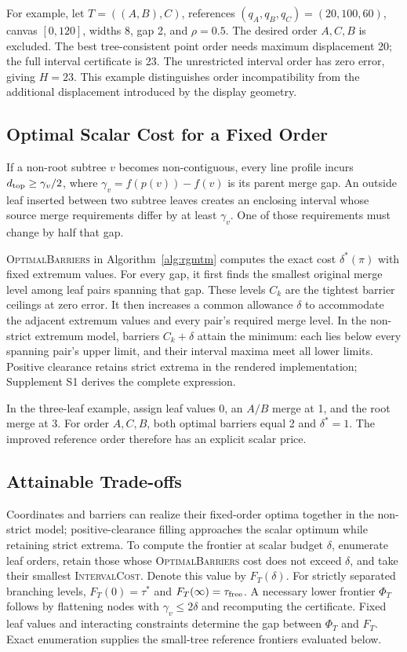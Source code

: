 For example, let $T=((A,B),C)$, references $(q_A,q_B,q_C)=(20,100,60)$, canvas $[0,120]$, widths 8, gap 2, and $\rho=0.5$. The desired order $A,C,B$ is excluded. The best tree-consistent point order needs maximum displacement 20; the full interval certificate is 23. The unrestricted interval order has zero error, giving $H=23$. This example distinguishes order incompatibility from the additional displacement introduced by the display geometry.

\subsection{Optimal Scalar Cost for a Fixed Order}\label{sec:topological}
If a non-root subtree $v$ becomes non-contiguous, every line profile incurs $d_{\rm top}\ge\gamma_v/2$, where $\gamma_v=f(p(v))-f(v)$ is its parent merge gap. An outside leaf inserted between two subtree leaves creates an enclosing interval whose source merge requirements differ by at least $\gamma_v$. One of those requirements must change by half that gap.

\textsc{OptimalBarriers} in Algorithm~\ref{alg:rgmtm} computes the exact cost $\delta^*(\pi)$ with fixed extremum values. For every gap, it first finds the smallest original merge level among leaf pairs spanning that gap. These levels $C_k$ are the tightest barrier ceilings at zero error. It then increases a common allowance $\delta$ to accommodate the adjacent extremum values and every pair's required merge level. In the non-strict extremum model, barriers $C_k+\delta$ attain the minimum: each lies below every spanning pair's upper limit, and their interval maxima meet all lower limits. Positive clearance retains strict extrema in the rendered implementation; Supplement S1 derives the complete expression.

In the three-leaf example, assign leaf values 0, an $A/B$ merge at 1, and the root merge at 3. For order $A,C,B$, both optimal barriers equal 2 and $\delta^*=1$. The improved reference order therefore has an explicit scalar price.

\subsection{Attainable Trade-offs}
Coordinates and barriers can realize their fixed-order optima together in the non-strict model; positive-clearance filling approaches the scalar optimum while retaining strict extrema. To compute the frontier at scalar budget $\delta$, enumerate leaf orders, retain those whose \textsc{OptimalBarriers} cost does not exceed $\delta$, and take their smallest \textsc{IntervalCost}. Denote this value by $F_T(\delta)$. For strictly separated branching levels, $F_T(0)=\tau^*$ and $F_T(\infty)=\tau_{\mathrm{free}}$. A necessary lower frontier $\Phi_T$ follows by flattening nodes with $\gamma_v\le2\delta$ and recomputing the certificate. Fixed leaf values and interacting constraints determine the gap between $\Phi_T$ and $F_T$. Exact enumeration supplies the small-tree reference frontiers evaluated below.
